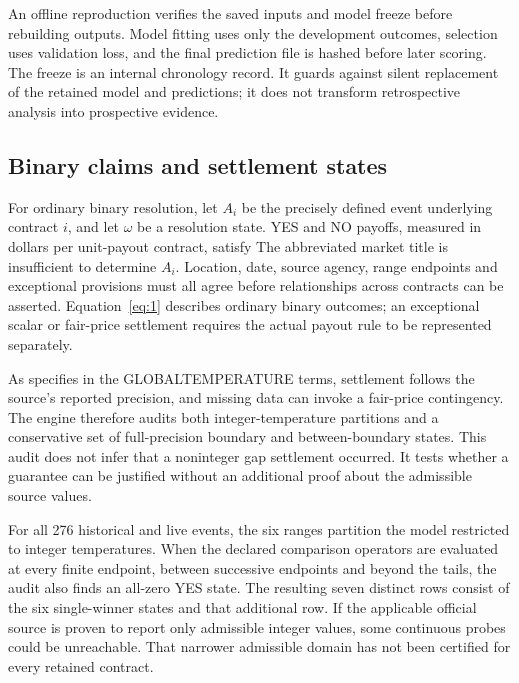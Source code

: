 An offline reproduction verifies the saved inputs and model freeze before rebuilding outputs. Model fitting uses only the development outcomes, selection uses validation loss, and the final prediction file is hashed before later scoring. The freeze is an internal chronology record. It guards against silent replacement of the retained model and predictions; it does not transform retrospective analysis into prospective evidence.

\label{sec:microstructure}
\subsection{Binary claims and settlement states}
For ordinary binary resolution, let $A_i$ be the precisely defined event underlying contract $i$, and let $\omega$ be a resolution state. YES and NO payoffs, measured in dollars per unit-payout contract, satisfy
The abbreviated market title is insufficient to determine $A_i$. Location, date, source agency, range endpoints and exceptional provisions must all agree before relationships across contracts can be asserted. Equation~\ref{eq:1} describes ordinary binary outcomes; an exceptional scalar or fair-price settlement requires the actual payout rule to be represented separately.

As  specifies in the GLOBALTEMPERATURE terms, settlement follows the source's reported precision, and missing data can invoke a fair-price contingency. The engine therefore audits both integer-temperature partitions and a conservative set of full-precision boundary and between-boundary states. This audit does not infer that a noninteger gap settlement occurred. It tests whether a guarantee can be justified without an additional proof about the admissible source values.


For all 276 historical and live events, the six ranges partition the model restricted to integer temperatures. When the declared comparison operators are evaluated at every finite endpoint, between successive endpoints and beyond the tails, the audit also finds an all-zero YES state. The resulting seven distinct rows consist of the six single-winner states and that additional row. If the applicable official source is proven to report only admissible integer values, some continuous probes could be unreachable. That narrower admissible domain has not been certified for every retained contract.

